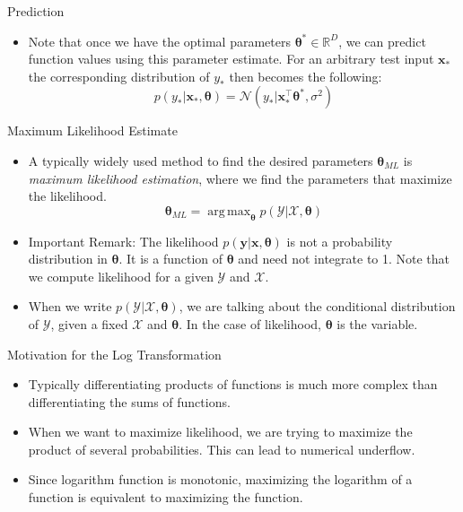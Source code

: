 \documentclass{beamer}
\DeclareMathOperator*{\argmax}{arg\,max}
\begin{document}
\begin{frame}{Prediction}
\begin{itemize}[<+->]
\item Note that once we have the optimal parameters $\boldsymbol{\theta}^{*} \in \mathbb{R}^{D}$, we can predict function values using this parameter estimate. For an arbitrary test input $\boldsymbol{x}_{*}$ the corresponding distribution of $y_{*}$ then becomes the following:
\begin{equation*}
p(y_{*}|\boldsymbol{x}_{*}, \boldsymbol{\theta}) = \mathcal{N}(y_{*} | \boldsymbol{x}_{*}^{\top}\boldsymbol{\theta}^{*}, \sigma^{2})
\end{equation*}
\end{itemize}
\end{frame}



\begin{frame}{Maximum Likelihood Estimate}
\begin{itemize}
\item A typically widely used method to find the desired parameters $\boldsymbol{\theta}_{ML}$ is \textit{maximum likelihood estimation}, where we find the parameters that maximize the likelihood. 
\begin{equation*}
\boldsymbol{\theta}_{ML} = \argmax_{\boldsymbol{\theta}} p(\mathcal{Y} | \mathcal{X, \boldsymbol{\theta}})
\end{equation*}
\pause
\item Important Remark: The likelihood $p(\boldsymbol{y}|\boldsymbol{x}, \boldsymbol{\theta})$ is not a probability distribution in $\boldsymbol{\theta}$. It is a function of $\boldsymbol{\theta}$ and need not integrate to 1. Note that we compute likelihood for a given $\mathcal{Y}$ and $\mathcal{X}$.
\pause
\item When we write $p(\mathcal{Y} | \mathcal{X, \boldsymbol{\theta}})$, we are talking about the conditional distribution of $\mathcal{Y}$, given a fixed $\mathcal{X}$ and $\boldsymbol{\theta}$. In the case of likelihood, $\boldsymbol{\theta}$ is the variable.
\end{itemize}
\end{frame}

\begin{frame}{Motivation for the Log Transformation}
\begin{itemize}[<+->]
\item Typically differentiating products of functions is much more complex than differentiating the sums of functions.
\item When we want to maximize likelihood, we are trying to maximize the product of several probabilities. This can lead to numerical underflow. 
\item Since logarithm function is monotonic, maximizing the logarithm of a function is equivalent to maximizing the function. 
\end{itemize}
\end{frame}
\end{document}
